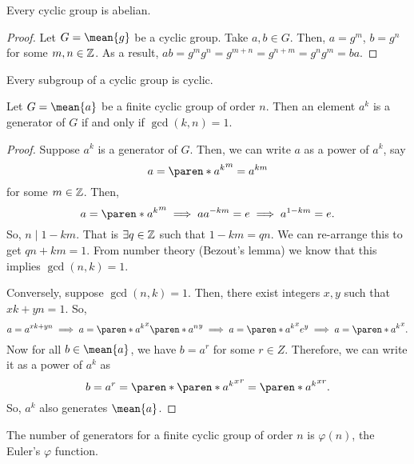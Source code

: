 \documentclass[11pt]{penrose}
\newcommand{\cyclic}[1]{\mean{#1}}
\begin{document}
\begin{nthm}
    Every cyclic group is abelian.
\end{nthm}
\begin{proof}
    Let $G = \cyclic{g}$ be a cyclic group. Take $a, b \in G$. Then, $a = g^m$, $b = g^n$ for some $m, n \in \mathbb{Z}$. As a result, $ab = g^m g^n = g^{m+n} = g^{n+m} = g^n g^m = ba$.
\end{proof}

\begin{nthm}
    Every subgroup of a cyclic group is cyclic.
\end{nthm}

\begin{nthm}
    Let $G = \cyclic{a}$ be a finite cyclic group of order $n$. Then an element $a^k$ is a generator of $G$ if and only if $\gcd(k,n) = 1$.
\end{nthm}
\begin{proof}
    Suppose $a^k$ is a generator of $G$. Then, we can write $a$ as a power of $a^k$, say
    \begin{equation}
        a = \paren*{a^k}^m = a^{km}
    \end{equation}
    for some $m \in \mathbb{Z}$. Then,
    \begin{equation}
        a = \paren*{a^k}^m
        \implies
        a a^{-km} = e
        \implies
        a^{1-km} = e.
    \end{equation}
    So, $n \mid 1 - km$. That is $\exists q \in \mathbb{Z}$ such that $1 - km = qn$. We can re-arrange this to get $qn + km = 1$. From number theory (Bezout's lemma) we know that this implies $\gcd(n,k)=1$.

    Conversely, suppose $\gcd(n,k)=1$. Then, there exist integers $x, y$ such that $xk + yn = 1$. So,
    \begin{equation}
        a = a^{xk + yn}
        \implies
        a = \paren*{a^{k}}^{x} \paren*{a^{n}}^{y}
        \implies
        a = \paren*{a^{k}}^{x} e^{y}
        \implies
        a = \paren*{a^{k}}^{x}.
    \end{equation}
    Now for all $b \in \cyclic{a}$, we have $b = a^r$ for some $r \in Z$. Therefore, we can write it as a power of $a^k$ as
    \begin{equation}
        b = a^r = \paren*{\paren*{a^{k}}^{x}}^{r} = \paren*{a^{k}}^{xr}.
    \end{equation}
    So, $a^k$ also generates $\cyclic{a}$.
\end{proof}

\begin{remark}
    The number of generators for a finite cyclic group of order $n$ is $\varphi(n)$, the Euler's $\varphi$ function.
\end{remark}
\end{document}
